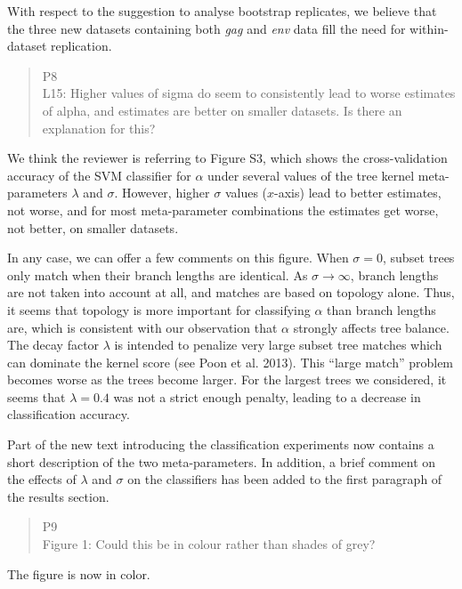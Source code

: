 \documentclass[12pt]{letter}
\begin{document}
\begin{letter}{ }
With respect to the suggestion to analyse bootstrap replicates, we believe that
the three new datasets containing both \textit{gag} and \textit{env} data fill
the need for within-dataset replication.

\begin{quote}
  \itshape

  P8 \\
  L15: Higher values of sigma do seem to consistently lead to worse estimates
  of alpha, and estimates are better on smaller datasets. Is there an
  explanation for this?
\end{quote}

We think the reviewer is referring to Figure S3, which shows the
cross-validation accuracy of the SVM classifier for $\alpha$ under several
values of the tree kernel meta-parameters $\lambda$ and $\sigma$. However,
higher $\sigma$ values ($x$-axis) lead to better estimates, not worse, and for
most meta-parameter combinations the estimates get worse, not better, on
smaller datasets. 

In any case, we can offer a few comments on this figure. When $\sigma = 0$,
subset trees only match when their branch lengths are identical. As $\sigma \to
\infty$, branch lengths are not taken into account at all, and matches are
based on topology alone. Thus, it seems that topology is more important for
classifying $\alpha$ than branch lengths are, which is consistent with our
observation that $\alpha$ strongly affects tree balance. The decay factor
$\lambda$ is intended to penalize very large subset tree matches which can
dominate the kernel score (see Poon et al. 2013). This ``large match'' problem
becomes worse as the trees become larger. For the largest trees we considered, 
it seems that $\lambda = 0.4$ was not a strict enough penalty, leading to a
decrease in classification accuracy. 

Part of the new text introducing the classification experiments now contains a
short description of the two meta-parameters. In addition, a brief comment
on the effects of $\lambda$ and $\sigma$ on the classifiers has been added to
the first paragraph of the results section.

\begin{quote}
  \itshape

  P9 \\
  Figure 1: Could this be in colour rather than shades of grey?
\end{quote}

The figure is now in color.


\end{letter}
\end{document}
